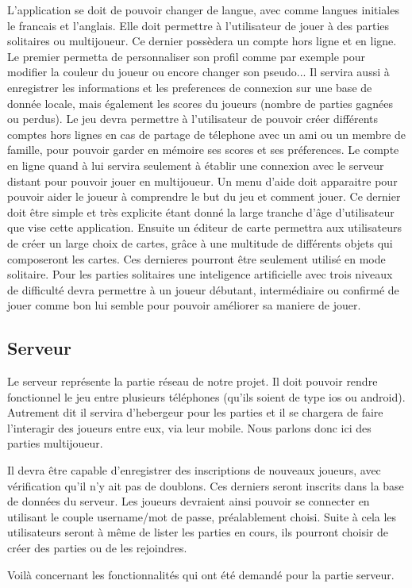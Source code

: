 	L'application se doit de pouvoir changer de langue, avec comme langues initiales le francais et l'anglais.
	Elle doit permettre à l'utilisateur de jouer à des parties solitaires ou multijoueur. 
	Ce dernier possèdera un compte hors ligne et en ligne.		
	Le premier permetta de personnaliser son profil comme par exemple pour modifier
	la couleur du joueur ou encore changer son pseudo... Il servira aussi à enregistrer les informations
	et les preferences de connexion sur une base de donnée locale,
	mais également les scores du joueurs (nombre de parties gagnées ou perdus). 
	Le jeu devra permettre à l'utilisateur de pouvoir créer différents comptes hors lignes en cas de partage de télephone
	avec un ami ou un membre de famille, pour pouvoir garder en mémoire ses scores et ses préferences.		
	Le compte en ligne quand à lui servira seulement à établir une connexion avec le serveur distant pour pouvoir jouer en multijoueur.		
	Un menu d'aide doit apparaitre pour pouvoir aider le joueur à comprendre le but du jeu et comment jouer. 
	Ce dernier doit être simple et très explicite étant donné la large tranche d'âge d'utilisateur que vise cette application.		
	Ensuite un éditeur de carte permettra aux utilisateurs de créer un large choix de cartes, 
	grâce à une multitude de différents objets qui composeront les cartes. Ces dernieres pourront être seulement utilisé en mode solitaire.
	Pour les parties solitaires une inteligence artificielle avec trois niveaux de difficulté 
	devra permettre à un joueur débutant, intermédiaire ou confirmé de jouer comme bon lui semble pour pouvoir améliorer sa maniere de jouer.
	
\subsection{Serveur}
	
	Le serveur représente la partie réseau de notre projet. Il doit pouvoir
	rendre fonctionnel le jeu entre plusieurs téléphones (qu'ils soient de type
	\gls{ios} ou \gls{android}). Autrement dit il servira d'hebergeur pour les parties et
	il se chargera de faire l'interagir des joueurs entre eux, via leur mobile.
	Nous parlons donc ici des parties multijoueur.
	
	Il devra être capable d'enregistrer des inscriptions de nouveaux joueurs, avec
	vérification qu'il n'y ait pas de doublons. Ces derniers seront inscrits dans 
	la base de données du serveur. Les joueurs devraient ainsi
	pouvoir se connecter en utilisant le couple username/mot de passe,
	préalablement choisi. Suite à cela les utilisateurs seront à même de lister
	les parties en cours, ils pourront choisir de créer des parties ou de les rejoindres.
	
	Voilà concernant les fonctionnalités qui ont été demandé pour la partie
	serveur.